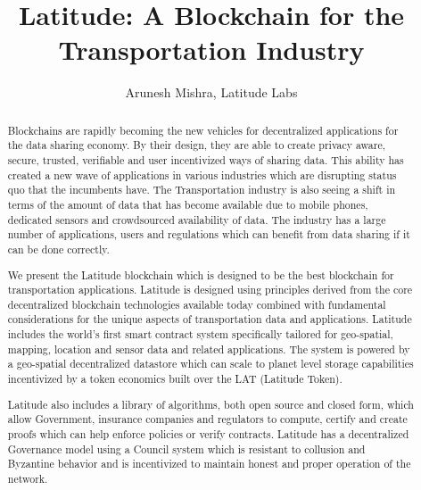 \documentclass[preprint,10pt]{elsarticle}
\theoremstyle{definition}
\begin{document}
\begin{frontmatter}


\title{\textsf{Latitude: A Blockchain for the Transportation Industry}}

\author{Arunesh Mishra, Latitude Labs}
\address{Silicon Valley, California}

\begin{abstract}

Blockchains are rapidly becoming the new vehicles for decentralized applications for the data sharing economy. By their
    design, they are able to create privacy aware, secure, trusted, verifiable and user incentivized ways of sharing
    data. This ability has created a new wave of applications in various industries which are disrupting status quo that
    the incumbents have. The Transportation industry is also seeing a shift in terms of the amount of data that has
    become available due to mobile phones, dedicated sensors and crowdsourced availability of data. The industry has a
    large number of applications, users and regulations which can benefit from data sharing if it can be done correctly.

 We present the Latitude blockchain which is designed to be the best blockchain for transportation applications.
    Latitude is designed using principles derived from the core decentralized blockchain technologies available today
    combined with fundamental considerations for the unique aspects of transportation data and applications. Latitude
    includes the world's first smart contract system specifically tailored for geo-spatial, mapping, location and sensor
    data and related applications. The system is powered by a geo-spatial decentralized datastore which can scale to
    planet level storage capabilities incentivized by a token economics built over the LAT (Latitude Token).

    Latitude also includes a library of algorithms, both open source and closed form, which allow Government, insurance
    companies and regulators to compute, certify and create proofs which can help enforce policies or verify contracts.
    Latitude has a decentralized Governance model using a Council system which is resistant to collusion and Byzantine
    behavior and is incentivized to maintain honest and proper operation of the network.


\end{abstract}
\end{frontmatter}
\end{document}
